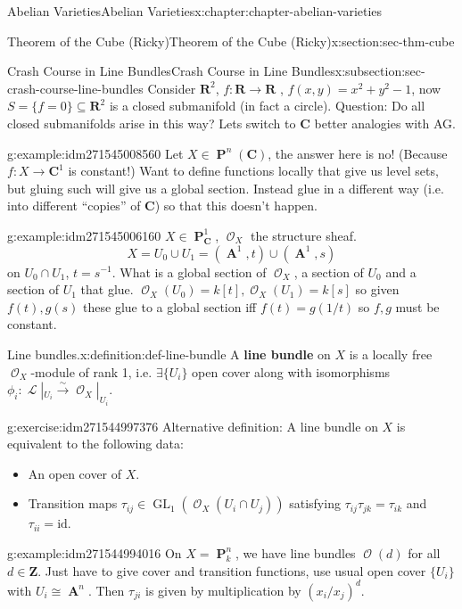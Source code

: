 \documentclass[oneside,10pt,]{book}
\newcommand{\terminology}[1]{\textbf{#1}}
\numberwithin{equation}{section}
\newcommand{\sheaf}[1]{\operatorname{\mathcal{#1}}}
\newcommand{\ZZ}{\mathbf{Z}}
\newcommand{\RR}{\mathbf{R}}
\newcommand{\CC}{\mathbf{C}}
\newcommand{\id}{\mathrm{id}}
\DeclareMathOperator{\aff}{\mathbf{A}}
\DeclareMathOperator{\PP}{\mathbf{P}}
\DeclareMathOperator{\GL}{GL}
\begin{document}
\begin{chapterptx}{Abelian Varieties}{}{Abelian Varieties}{}{}{x:chapter:chapter-abelian-varieties}
\begin{sectionptx}{Theorem of the Cube (Ricky)}{}{Theorem of the Cube (Ricky)}{}{}{x:section:sec-thm-cube}
\begin{subsectionptx}{Crash Course in Line Bundles}{}{Crash Course in Line Bundles}{}{}{x:subsection:sec-crash-course-line-bundles}
Consider \(\RR^2\), \(f\colon \RR \to \RR\) , \(f(x,y) = x^2 + y^2 -1\), now \(S = \{f=0\}\subseteq \RR^2\) is a closed submanifold (in fact a circle). Question: Do all closed submanifolds arise in this way? Lets switch to \(\CC\) better analogies with AG.%
\begin{example}{}{g:example:idm271545008560}%
Let \(X\in \PP^n(\CC)\), the answer here is no! (Because \(f\colon X \to \CC^1\) is constant!) Want to define functions locally that give us level sets, but gluing such will give us a global section. Instead glue in a different way (i.e. into different ``copies'' of \(\CC\)) so that this doesn't happen.%
\end{example}
\begin{example}{}{g:example:idm271545006160}%
\(X\in \PP_\CC^1\), \(\sheaf O_X\) the structure sheaf.%
\begin{equation*}
X = U_0 \cup U_1 = (\aff^1,t) \cup(\aff^1,s)
\end{equation*}
on \(U_0\cap U_1\), \(t = s^{-1}\). What is a global section of \(\sheaf O_X\), a section of \(U_0\) and a section of \(U_1\) that glue. \(\sheaf O_X(U_0) =  k[t], \sheaf O_X(U_1) =  k[s]\) so given \(f(t), g(s)\) these glue to a global section iff \(f(t) = g(1/t)\) so \(f,g\) must be constant.%
\end{example}
\begin{definition}{Line bundles.}{x:definition:def-line-bundle}%
A \terminology{line bundle} on \(X\) is a locally free \(\sheaf O_X\)-module of rank 1, i.e. \(\exists \{U_i\}\) open cover along with isomorphisms \(\phi_i\colon \sheaf L|_{U_i} \xrightarrow\sim \sheaf O_X |_{U_i}\).%
\end{definition}
\begin{inlineexercise}{}{g:exercise:idm271544997376}%
Alternative definition: A line bundle on \(X\) is equivalent to the following data:%
\begin{itemize}[label=\textbullet]
\item{}An open cover of \(X\).%
\item{}Transition maps \(\tau_{ij} \in \GL_1(\sheaf O_X(U_i\cap U_j))\) satisfying \(\tau_{ij}\tau_{jk} =\tau_{ik}\) and \(\tau_{ii} = \id\).%
\end{itemize}
%
\end{inlineexercise}
\begin{example}{}{g:example:idm271544994016}%
On \(X = \PP^n_k\), we have line bundles \(\sheaf O(d)\) for all \(d\in \ZZ\). Just have to give cover and transition functions, use usual open cover \(\{U_i\}\) with \(U_i\cong \aff^n\). Then \(\tau_{ji}\) is given by multiplication by \((x_i/x_j)^d\).%

\end{example}
\end{subsectionptx}
\end{sectionptx}
\end{chapterptx}
\end{document}

